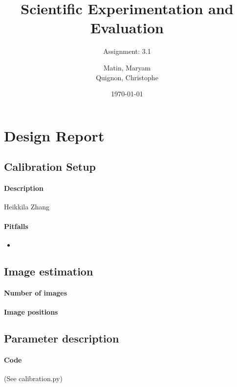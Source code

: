 \documentclass{scrartcl}
\begin{document}
\title{Scientific Experimentation and Evaluation
}
\subtitle{
Assignment: 3.1}
\author{
  Matin, Maryam \\
  Quignon, Christophe
}
\date{\today}


\maketitle


\section{Design Report}

\subsection{Calibration Setup}
\paragraph{Description}
Heikkila\cite{heikkila}
Zhang\cite{zhang}

\paragraph{Pitfalls}
\begin{itemize}
\item 
\end{itemize}


\subsection{Image estimation}
\paragraph{Number of images}

\paragraph{Image positions}


\subsection{Parameter description}
\paragraph{Code}
(See calibration.py)

\end{document}
